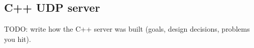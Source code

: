 \IfFileExists{IEEEtran.cls}{\ieeetrue\documentclass[conference]{IEEEtran}}{\ieeefalse\documentclass[twocolumn,10pt]{article}}
\begin{document}
\subsection{C++ UDP server}
TODO: write how the C++ server was built (goals, design decisions, problems you hit).
\end{document}
